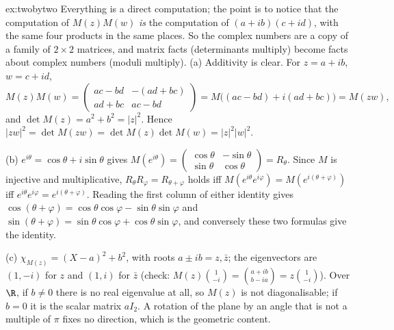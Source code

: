\begin{solution}{ex:twobytwo}
\idea Everything is a direct computation; the point is to notice that the computation of $M(z)M(w)$ \emph{is} the computation of $(a+ib)(c+id)$, with the same four products in the same places. So the complex numbers are a copy of a family of $2\times2$ matrices, and matrix facts (determinants multiply) become facts about complex numbers (moduli multiply).
\writeup (a) Additivity is clear. For $z=a+ib$, $w=c+id$,
\[
M(z)M(w)=\begin{pmatrix}ac-bd&-(ad+bc)\\ad+bc&ac-bd\end{pmatrix}=M\big((ac-bd)+i(ad+bc)\big)=M(zw),
\]
and $\det M(z)=a^2+b^2=|z|^2$. Hence $|zw|^2=\det M(zw)=\det M(z)\det M(w)=|z|^2|w|^2$.

(b) $e^{i\theta}=\cos\theta+i\sin\theta$ gives $M(e^{i\theta})=\begin{pmatrix}\cos\theta&-\sin\theta\\\sin\theta&\cos\theta\end{pmatrix}=R_\theta$. Since $M$ is injective and multiplicative, $R_\theta R_\varphi=R_{\theta+\varphi}$ holds iff $M(e^{i\theta}e^{i\varphi})=M(e^{i(\theta+\varphi)})$ iff $e^{i\theta}e^{i\varphi}=e^{i(\theta+\varphi)}$. Reading the first column of either identity gives $\cos(\theta+\varphi)=\cos\theta\cos\varphi-\sin\theta\sin\varphi$ and $\sin(\theta+\varphi)=\sin\theta\cos\varphi+\cos\theta\sin\varphi$, and conversely these two formulas give the identity.

(c) $\chi_{M(z)}=(X-a)^2+b^2$, with roots $a\pm ib=z,\bar z$; the eigenvectors are $(1,-i)$ for $z$ and $(1,i)$ for $\bar z$ (check: $M(z)\binom1{-i}=\binom{a+ib}{b-ia}=z\binom1{-i}$). Over $\R$, if $b\ne0$ there is no real eigenvalue at all, so $M(z)$ is not diagonalisable; if $b=0$ it is the scalar matrix $aI_2$. A rotation of the plane by an angle that is not a multiple of $\pi$ fixes no direction, which is the geometric content.
\end{solution}

